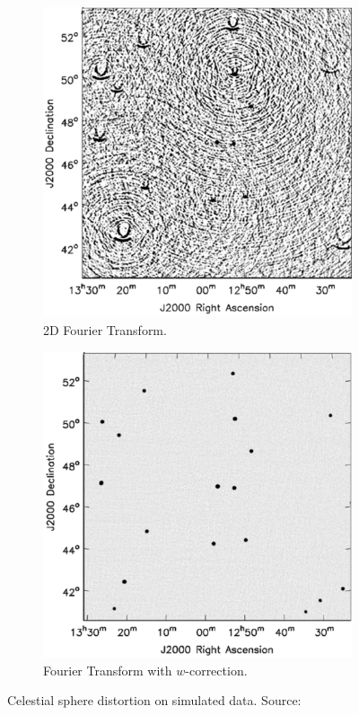 \begin{figure}[h]
	\centering
	\begin{subfigure}[b]{0.45\linewidth}
		\includegraphics[width=\linewidth]{./chapters/03.challenges/w-no-correction.png}
		\caption{2D Fourier Transform.}
		\label{meerkat:2dfft}
	\end{subfigure}
	\begin{subfigure}[b]{0.45\linewidth}
		\includegraphics[width=\linewidth]{./chapters/03.challenges/w-correction.png}
		\caption{Fourier Transform with $w$-correction.}
		\label{meerkat:wcorrection}
	\end{subfigure}
	\caption{Celestial sphere distortion on simulated data. Source: \cite{cornwell2008noncoplanar}}
	\label{meerkat:wdistortion}
\end{figure}

